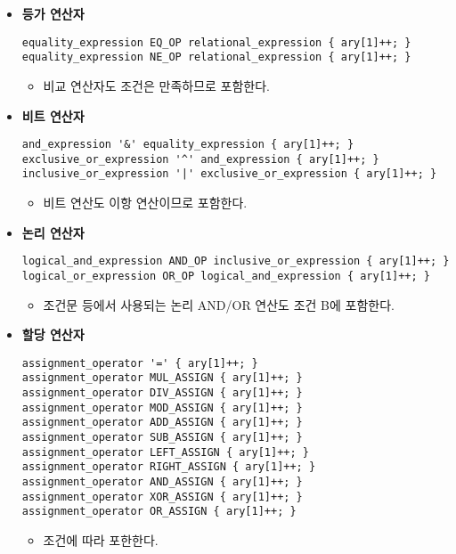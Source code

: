 \documentclass{article}
\begin{document}
\begin{itemize}
  \item \textbf{등가 연산자}
  \begin{lstlisting}
equality_expression EQ_OP relational_expression { ary[1]++; }
equality_expression NE_OP relational_expression { ary[1]++; }
  \end{lstlisting}
  \begin{itemize}
    \item 비교 연산자도 조건은 만족하므로 포함한다.
  \end{itemize}

  \item \textbf{비트 연산자}
  \begin{lstlisting}
and_expression '&' equality_expression { ary[1]++; }
exclusive_or_expression '^' and_expression { ary[1]++; }
inclusive_or_expression '|' exclusive_or_expression { ary[1]++; }
  \end{lstlisting}
  \begin{itemize}
    \item 비트 연산도 이항 연산이므로 포함한다.
  \end{itemize}

  \item \textbf{논리 연산자}
  \begin{lstlisting}
logical_and_expression AND_OP inclusive_or_expression { ary[1]++; }
logical_or_expression OR_OP logical_and_expression { ary[1]++; }
  \end{lstlisting}
  \begin{itemize}
    \item 조건문 등에서 사용되는 논리 AND/OR 연산도 조건 B에 포함한다.
  \end{itemize}

  \item \textbf{할당 연산자}
  \begin{lstlisting}
assignment_operator '=' { ary[1]++; }
assignment_operator MUL_ASSIGN { ary[1]++; }
assignment_operator DIV_ASSIGN { ary[1]++; }
assignment_operator MOD_ASSIGN { ary[1]++; }
assignment_operator ADD_ASSIGN { ary[1]++; }
assignment_operator SUB_ASSIGN { ary[1]++; }
assignment_operator LEFT_ASSIGN { ary[1]++; }
assignment_operator RIGHT_ASSIGN { ary[1]++; }
assignment_operator AND_ASSIGN { ary[1]++; }
assignment_operator XOR_ASSIGN { ary[1]++; }
assignment_operator OR_ASSIGN { ary[1]++; }
  \end{lstlisting}
  \begin{itemize}
    \item 조건에 따라 포한한다.
  \end{itemize}


\end{itemize}
\end{document}
